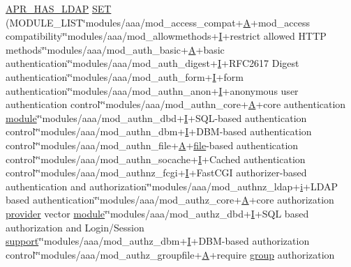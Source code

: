 \begin{DoxyCompactItemize}
\hyperlink{group__APR__Util__LDAP_gaf8d199208a26c4ee4c6db46764675f01}{A\+P\+R\+\_\+\+H\+A\+S\+\_\+\+L\+D\+AP} \hyperlink{CMakeLists_8txt_ac0317ab7d57691968a62054d0be53b4e}{S\+ET} (M\+O\+D\+U\+L\+E\+\_\+\+L\+I\+ST\char`\"{}modules/aaa/mod\+\_\+access\+\_\+compat+\hyperlink{pcregrep_8txt_ae7af65aae7738174b8f4c0662da372d5}{A}+mod\+\_\+access compatibility\char`\"{}\char`\"{}modules/aaa/mod\+\_\+allowmethods+\hyperlink{apr__md5_8c_ac0eafdc9ee161b71e7af98af736952fd}{I}+restrict allowed H\+T\+TP methods\char`\"{}\char`\"{}modules/aaa/mod\+\_\+auth\+\_\+basic+\hyperlink{pcregrep_8txt_ae7af65aae7738174b8f4c0662da372d5}{A}+basic authentication\char`\"{}\char`\"{}modules/aaa/mod\+\_\+auth\+\_\+digest+\hyperlink{apr__md5_8c_ac0eafdc9ee161b71e7af98af736952fd}{I}+R\+F\+C2617 Digest authentication\char`\"{}\char`\"{}modules/aaa/mod\+\_\+auth\+\_\+form+\hyperlink{apr__md5_8c_ac0eafdc9ee161b71e7af98af736952fd}{I}+form authentication\char`\"{}\char`\"{}modules/aaa/mod\+\_\+authn\+\_\+anon+\hyperlink{apr__md5_8c_ac0eafdc9ee161b71e7af98af736952fd}{I}+anonymous user authentication control\char`\"{}\char`\"{}modules/aaa/mod\+\_\+authn\+\_\+core+\hyperlink{pcregrep_8txt_ae7af65aae7738174b8f4c0662da372d5}{A}+core authentication \hyperlink{group__APACHE__CORE__CONFIG_ga0ea4f633a5f9f88e1603aaeb1f2b2e69}{module}\char`\"{}\char`\"{}modules/aaa/mod\+\_\+authn\+\_\+dbd+\hyperlink{apr__md5_8c_ac0eafdc9ee161b71e7af98af736952fd}{I}+S\+QL-\/based authentication control\char`\"{}\char`\"{}modules/aaa/mod\+\_\+authn\+\_\+dbm+\hyperlink{apr__md5_8c_ac0eafdc9ee161b71e7af98af736952fd}{I}+D\+BM-\/based authentication control\char`\"{}\char`\"{}modules/aaa/mod\+\_\+authn\+\_\+file+\hyperlink{pcregrep_8txt_ae7af65aae7738174b8f4c0662da372d5}{A}+\hyperlink{pcregrep_8txt_ac062b5382a17ef4e936c49bdd74c5563}{file}-\/based authentication control\char`\"{}\char`\"{}modules/aaa/mod\+\_\+authn\+\_\+socache+\hyperlink{apr__md5_8c_ac0eafdc9ee161b71e7af98af736952fd}{I}+Cached authentication control\char`\"{}\char`\"{}modules/aaa/mod\+\_\+authnz\+\_\+fcgi+\hyperlink{apr__md5_8c_ac0eafdc9ee161b71e7af98af736952fd}{I}+Fast\+C\+GI authorizer-\/based authentication and authorization\char`\"{}\char`\"{}modules/aaa/mod\+\_\+authnz\+\_\+ldap+\hyperlink{group__MOD__PROXY_ga38403a0592eb8018a3ad61aef0f7ca2c}{i}+L\+D\+AP based authentication\char`\"{}\char`\"{}modules/aaa/mod\+\_\+authz\+\_\+core+\hyperlink{pcregrep_8txt_ae7af65aae7738174b8f4c0662da372d5}{A}+core authorization \hyperlink{group__MOD__DAV_gaf0b2e32aa25087ef77626ce8bb9d7aa4}{provider} vector \hyperlink{group__APACHE__CORE__CONFIG_ga0ea4f633a5f9f88e1603aaeb1f2b2e69}{module}\char`\"{}\char`\"{}modules/aaa/mod\+\_\+authz\+\_\+dbd+\hyperlink{apr__md5_8c_ac0eafdc9ee161b71e7af98af736952fd}{I}+S\+QL based authorization and Login/Session \hyperlink{pcregrep_8txt_ad138d584026b091836ba441440a66ff5}{support}\char`\"{}\char`\"{}modules/aaa/mod\+\_\+authz\+\_\+dbm+\hyperlink{apr__md5_8c_ac0eafdc9ee161b71e7af98af736952fd}{I}+D\+BM-\/based authorization control\char`\"{}\char`\"{}modules/aaa/mod\+\_\+authz\+\_\+groupfile+\hyperlink{pcregrep_8txt_ae7af65aae7738174b8f4c0662da372d5}{A}+\textquotesingle{}require \hyperlink{group__MOD__DAV_gadc3add9d56a1a732c371606682db4c4e}{group}\textquotesingle{} authorization 
\end{DoxyCompactItemize}
